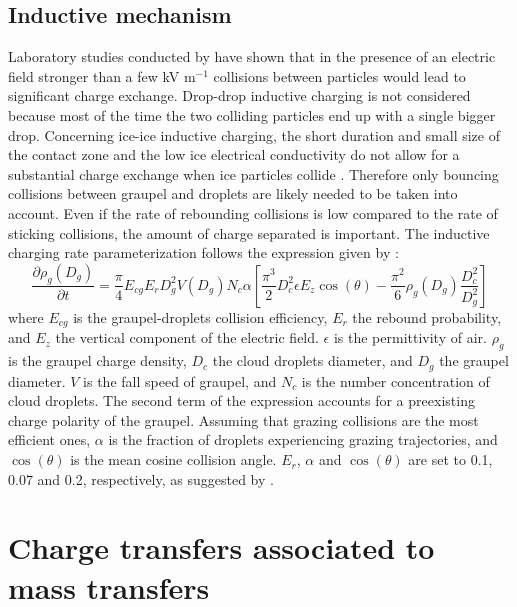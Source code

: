 \subsection{Inductive mechanism}

Laboratory studies conducted by \citet{Aufdermaur-1972} have shown that in the presence of an electric field stronger than a few kV m$^{-1}$ collisions between particles would lead to significant charge exchange. 
Drop-drop inductive charging is not considered because most of the time the two colliding particles end up with a single bigger drop. 
Concerning ice-ice inductive charging, the short duration and small size of the contact zone and the low ice electrical conductivity do not allow for a substantial charge exchange when ice particles collide \citep{Illingworth-1985a}. 
Therefore only bouncing collisions between graupel and droplets are likely needed to be taken into account. 
Even if the rate of rebounding collisions is low compared to the rate of sticking collisions, the amount of charge separated is important. 
The inductive charging rate parameterization follows the expression given by \citet{Ziegler-1991}:
\begin{equation}
  \frac{\partial \rho_g (D_g)}{\partial t} = \frac{\pi}{4} E_{cg} E_r D_g ^2 V(D_g) N_c \alpha \left[ \frac{\pi ^3}{2} D_c ^2 \epsilon E_z \cos(\theta) - \frac{\pi ^2}{6}\rho_g(D_g) \frac{D_c ^2}{D_g ^2} \right]
\end{equation}
where $E_{cg}$ is the graupel-droplets collision efficiency, $E_r$ the rebound probability, and $E_z$ the vertical component of the electric field. 
$\epsilon$ is the permittivity of air. 
$\rho _g$ is the graupel charge density, $D_c$ the cloud droplets diameter, and $D_g$ the graupel diameter. 
$V$ is the fall speed of graupel, and $N_c$ is the number concentration of cloud droplets. 
The second term of the expression accounts for a preexisting charge polarity of the graupel. 
Assuming that grazing collisions are the most efficient ones, $\alpha$ is the fraction of droplets experiencing grazing trajectories, and $\cos(\theta)$ is the mean cosine collision angle. 
$E_r$, $\alpha$ and $\cos(\theta)$ are set to 0.1, 0.07 and 0.2, respectively, as suggested by \citet{Ziegler-1991}.


\section{Charge transfers associated to mass transfers}
\label{sec:micro}

